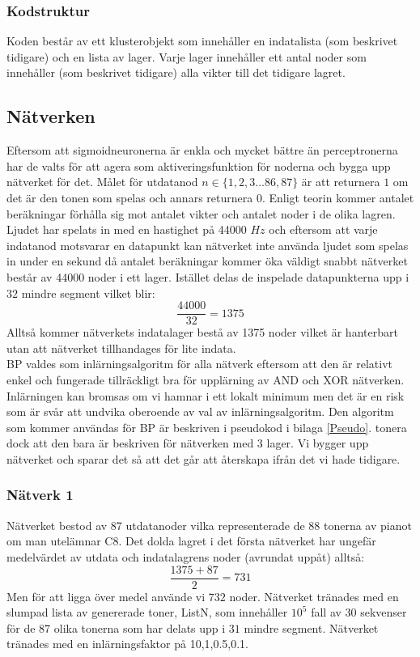 \documentclass[a4paper,10pt]{article}
\begin{document}
\subsubsection{Kodstruktur}
Koden består av ett klusterobjekt som innehåller en indatalista (som beskrivet tidigare) och en lista av lager. Varje lager innehåller ett antal noder som innehåller (som beskrivet tidigare) alla vikter till det tidigare lagret.

\subsection{Nätverken}
Eftersom att sigmoidneuronerna är enkla och mycket bättre än perceptronerna har de valts för att agera som aktiveringsfunktion för noderna och bygga upp nätverket för det. Målet för utdatanod $n\in\{1,2,3...86,87\}$ är att returnera $1$ om det är den tonen som spelas och annars returnera $0$.
Enligt teorin kommer antalet beräkningar förhålla sig mot antalet vikter och antalet noder i de olika lagren. Ljudet har spelats in med en hastighet på 44000 $Hz$ och eftersom att varje indatanod motsvarar en datapunkt kan nätverket inte använda ljudet som spelas in under en sekund då antalet beräkningar kommer öka väldigt snabbt nätverket består av 44000 noder i ett lager. Istället delas de inspelade datapunkterna upp i $32$ mindre segment vilket blir: \[\dfrac{44000}{32}=1375\] Alltså kommer nätverkets indatalager bestå av 1375 noder vilket är hanterbart utan att nätverket tillhandages för lite indata. \\
BP valdes som inlärningsalgoritm för alla nätverk eftersom att den är relativt enkel och fungerade tillräckligt bra för upplärning av AND och XOR nätverken. Inlärningen kan bromsas om vi hamnar i ett lokalt minimum\autocite{NNDL} men det är en risk som är svår att undvika oberoende av val av inlärningsalgoritm.
Den algoritm som kommer användas för BP är beskriven i pseudokod i bilaga \ref{Pseudo}. tonera dock att den bara är beskriven för nätverken med 3 lager. Vi bygger upp nätverket och sparar det så att det går att återskapa ifrån det vi hade tidigare. 


\subsubsection{Nätverk 1}
Nätverket bestod av 87 utdatanoder vilka representerade de 88 tonerna av pianot om man utelämnar C8. 
Det dolda lagret i det första nätverket har ungefär medelvärdet av utdata och indatalagrens noder (avrundat uppåt) alltså: \[\dfrac{1375+87}{2}=731\] Men för att ligga över medel använde vi $732$ noder. Nätverket tränades med en slumpad lista av genererade toner, ListN, som innehåller $10^5$ fall av 30 sekvenser för de 87 olika tonerna som har delats upp i $31$ mindre segment. Nätverket tränades med en inlärningsfaktor på 10,1,0.5,0.1. 
\end{document}
